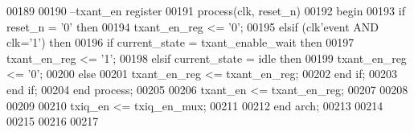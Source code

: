 \begin{DoxyCode}
00189  
00190 \textcolor{keyword}{--txant\_en register}
00191 \textcolor{keywordflow}{process}(clk, reset_n)
00192 \textcolor{vhdlkeyword}{begin}
00193    \textcolor{keywordflow}{if} \textcolor{vhdlchar}{reset_n} \textcolor{vhdlchar}{=} \textcolor{vhdlchar}{'}\textcolor{vhdllogic}{}\textcolor{vhdllogic}{0}\textcolor{vhdlchar}{'} \textcolor{keywordflow}{then} 
00194       \textcolor{vhdlchar}{txant_en_reg} \textcolor{vhdlchar}{<=} \textcolor{vhdlchar}{'}\textcolor{vhdllogic}{}\textcolor{vhdllogic}{0}\textcolor{vhdlchar}{'};
00195    \textcolor{keywordflow}{elsif} \textcolor{vhdlchar}{(}\textcolor{vhdlchar}{clk}\textcolor{vhdlchar}{'}\textcolor{vhdlkeyword}{event} \textcolor{keywordflow}{AND} \textcolor{vhdlchar}{clk}\textcolor{vhdlchar}{=}\textcolor{vhdlchar}{'}\textcolor{vhdllogic}{}\textcolor{vhdllogic}{1}\textcolor{vhdlchar}{'}\textcolor{vhdlchar}{)} \textcolor{keywordflow}{then} 
00196       \textcolor{keywordflow}{if} \textcolor{vhdlchar}{current_state} \textcolor{vhdlchar}{=} \textcolor{vhdlchar}{txant\_enable\_wait} \textcolor{keywordflow}{then} 
00197          \textcolor{vhdlchar}{txant_en_reg} \textcolor{vhdlchar}{<=} \textcolor{vhdlchar}{'}\textcolor{vhdllogic}{}\textcolor{vhdllogic}{1}\textcolor{vhdlchar}{'};
00198       \textcolor{keywordflow}{elsif} \textcolor{vhdlchar}{current_state} \textcolor{vhdlchar}{=} \textcolor{vhdlchar}{idle} \textcolor{keywordflow}{then} 
00199          \textcolor{vhdlchar}{txant_en_reg} \textcolor{vhdlchar}{<=} \textcolor{vhdlchar}{'}\textcolor{vhdllogic}{}\textcolor{vhdllogic}{0}\textcolor{vhdlchar}{'};
00200       \textcolor{keywordflow}{else} 
00201          \textcolor{vhdlchar}{txant_en_reg} \textcolor{vhdlchar}{<=} \textcolor{vhdlchar}{txant_en_reg};
00202       \textcolor{keywordflow}{end} \textcolor{keywordflow}{if};
00203    \textcolor{keywordflow}{end} \textcolor{keywordflow}{if};
00204 \textcolor{keywordflow}{end} \textcolor{keywordflow}{process};
00205 
00206 \textcolor{vhdlchar}{txant_en} \textcolor{vhdlchar}{<=} \textcolor{vhdlchar}{txant_en_reg};
00207     
00208 
00209     
00210 \textcolor{vhdlchar}{txiq_en} \textcolor{vhdlchar}{<=} \textcolor{vhdlchar}{txiq_en_mux};
00211   
00212 \textcolor{keywordflow}{end} \textcolor{vhdlchar}{arch};   
00213 
00214 
00215 
00216 
00217 
\end{DoxyCode}
